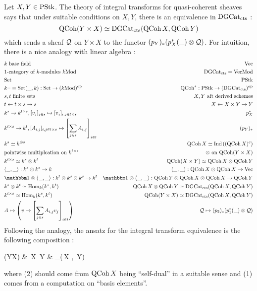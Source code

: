 \documentclass[./main.tex]{subfiles}
\begin{document}
Let $X, Y \in \mathrm{PStk}$.
The theory of integral transforms for quasi-coherent sheaves says that
under suitable conditions on $X, Y$,
there is an equivalence in $\mathrm{DGCat}_{\mathrm{cts}}$ : 
\[
  \mathrm{QCoh}(Y \times X) \simeq \mathrm{DGCat}_{\mathrm{cts}}(\mathrm{QCoh}\,X , \mathrm{QCoh}\,Y)
\]
which sends a sheaf $\mathcal{Q}$ on $Y \times X$ to
the functor $(p_Y)_*(p_X^*(\_) \otimes \mathcal{Q})$.
For intuition, there is a nice analogy with linear algebra  : 
\begin{align*}
  &k \text{ base field} 
    & \VEC \\
  & \text{1-category of $k$-modules } k\MOD
    & \DGCAT_\CTS = \VEC\MOD \\
  & \SET
    & \PSTK \\
  & k^\_ = \SET(\_,k) : \SET \to (k\MOD)^\OP
    & \QCOH^* : \PSTK \to (\DGCAT_\CTS)^\OP \\
  &s, t \text{ finite sets} 
    & X , Y \text{ aft derived schemes} \\
  & t \leftarrow t\times s \rightarrow s
    & X \leftarrow X \times Y \rightarrow Y \\
  & k^s \to k^{t \times s} , 
  [v_j]_{j \in s} \mapsto [v_j]_{i , j \in t \times s}
    & p_X^* \\
  & k^{t \times s} \to k^t , 
  [A_{i , j}]_{i , j \in t \times s} 
  \mapsto \sqbrkt{\sum_{j \in s} A_{i , j}}_{i \in t}
    & (p_Y)_* \\
  &k^s \simeq k^{\oplus s}
    & \QCOH\,X \simeq \IND\,((\QCOH\,X)^c)\\
  &\text{pointwise multiplcation on } k^{t \times s} 
    & \otimes \text{ on } \QCOH(Y \times X) \\
  &k^{t \times s} \simeq k^s \otimes k^t
    &\QCOH(X \times Y) \simeq \QCOH\,X \otimes \QCOH\,Y \\
  &\<\_,\_\> : k^s \otimes k^s \to k
    &\<\_ , \_\> : \QCOH\,X \otimes \QCOH\,X \to \VEC \\
  &\id{} \otimes \<\_,\_\> : k^t \otimes k^s \otimes k^s \to k^t
    &\id{} \otimes \<\_,\_\> : 
    \QCOH\,Y \otimes \QCOH\,X \otimes \QCOH\,X \to \QCOH\,Y \\
  &k^s \otimes k^t \simeq \HOM_k(k^s , k^t)
    &\QCOH\,X \otimes \QCOH\,Y \simeq \DGCAT_\CTS(\QCOH\,X , \QCOH\,Y) \\
  &k^{t \times s} \simeq \HOM_k(k^s , k^t)
    &\QCOH(Y \times X) \simeq \DGCAT_\CTS(\QCOH\,X , \QCOH\,Y) \\
  &A \mapsto \brkt{v \mapsto \sqbrkt{\sum_{j \in s} A_{i,j} v_j}_{i \in t}}
    & \QQ \mapsto (p_2)_*(p_1^*(\_) \otimes \QQ)
\end{align*}
Following the analogy, the ansatz for the integral transform equivalence
is the following composition : 
\begin{cd}
  {\QCOH(Y\times X)} & {\QCOH\,X \otimes \QCOH\,Y} & {\DGCAT_\CTS(\QCOH\,X , \QCOH\,Y)}
	\arrow["\sim"',"{(1)}", from=1-2, to=1-1]
	\arrow["\sim","{(2)}"', from=1-2, to=1-3]
\end{cd}
where (2) should come from $\mathrm{QCoh}\,X$ being ``self-dual'' in a suitable sense
and (1) comes from a computation on ``basis elements''.
\end{document}
